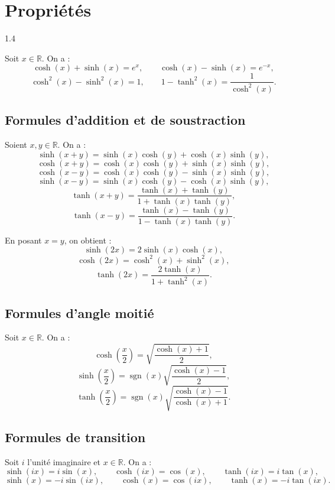 \documentclass{article}
\DeclareMathOperator{\sgn}{sgn}
\begin{document}
\section{Propriétés}

\begin{spacing}{1.4}

\begin{tcolorbox}[colframe=blue!75!black,colback=blue!5!white,title=Propriétés fondamentales]
Soit $x\in\mathbb{R}$. On a :
\[
\cosh(x)+\sinh(x)=e^x,
\qquad
\cosh(x)-\sinh(x)=e^{-x},
\]
\[
\cosh^2(x)-\sinh^2(x)=1,
\qquad
1-\tanh^2(x)=\frac{1}{\cosh^2(x)}.
\]
\end{tcolorbox}

\subsection{Formules d'addition et de soustraction}
\begin{tcolorbox}[colframe=blue!75!black,colback=blue!5!white,title=Addition et soustraction]
Soient $x,y\in\mathbb{R}$. On a :
\[
\sinh(x+y)=\sinh(x)\cosh(y)+\cosh(x)\sinh(y),
\]
\[
\cosh(x+y)=\cosh(x)\cosh(y)+\sinh(x)\sinh(y),
\]
\[
\cosh(x-y)=\cosh(x)\cosh(y)-\sinh(x)\sinh(y),
\]
\[
\sinh(x-y)=\sinh(x)\cosh(y)-\cosh(x)\sinh(y),
\]
\[
\tanh(x+y)=\frac{\tanh(x)+\tanh(y)}{1+\tanh(x)\tanh(y)},
\]
\[
\tanh(x-y)=\frac{\tanh(x)-\tanh(y)}{1-\tanh(x)\tanh(y)}.
\]
\end{tcolorbox}

\begin{tcolorbox}[colframe=blue!75!black,colback=blue!5!white,title=Cas particulier]
En posant $x=y$, on obtient :
\[
\sinh(2x)=2\sinh(x)\cosh(x),
\]
\[
\cosh(2x)=\cosh^2(x)+\sinh^2(x),
\]
\[
\tanh(2x)=\frac{2\tanh(x)}{1+\tanh^2(x)}.
\]
\end{tcolorbox}

\subsection{Formules d'angle moitié}
\begin{tcolorbox}[colframe=blue!75!black,colback=blue!5!white,title=Formules d'angle moitié]
Soit $x\in\mathbb{R}$. On a :
\[
\cosh\left(\frac{x}{2}\right)=\sqrt{\frac{\cosh(x)+1}{2}},
\]
\[
\sinh\left(\frac{x}{2}\right)=\sgn(x)\sqrt{\frac{\cosh(x)-1}{2}},
\]
\[
\tanh\left(\frac{x}{2}\right)=\sgn(x)\sqrt{\frac{\cosh(x)-1}{\cosh(x)+1}}.
\]
\end{tcolorbox}

\subsection{Formules de transition}
\begin{tcolorbox}[colframe=blue!75!black,colback=blue!5!white,title=Formules trigonométriques-hyperboliques]
Soit $i$ l'unité imaginaire et $x\in\mathbb{R}$. On a :
\[
\sinh(ix)=i\sin(x),
\qquad
\cosh(ix)=\cos(x),
\qquad
\tanh(ix)=i\tan(x),
\]
\[
\sinh(x)=-i\sin(ix),
\qquad
\cosh(x)=\cos(ix),
\qquad
\tanh(x)=-i\tan(ix).
\]
\end{tcolorbox}


\end{spacing}
\end{document}
